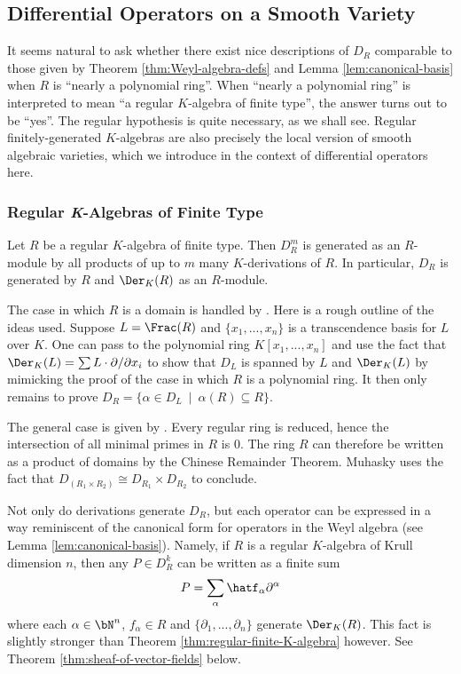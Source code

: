\subsection{Differential Operators on a Smooth Variety}\label{sec:diff-op-examples}
It seems natural to ask whether there exist nice descriptions of $D_{R}$ comparable to those given by Theorem \ref{thm:Weyl-algebra-defs} and Lemma \ref{lem:canonical-basis} when $R$ is ``nearly a polynomial ring''. When ``nearly a polynomial ring'' is interpreted to mean ``a regular $K$-algebra of finite type'', the answer turns out to be ``yes''. The regular hypothesis is quite necessary, as we shall see. Regular finitely-generated $K$-algebras are also precisely the local version of smooth algebraic varieties, which we introduce in the context of differential operators here.
\subsubsection{Regular \textit{K}-Algebras of Finite Type}

\begin{thm}\label{thm:regular-finite-K-algebra}
	Let $R$ be a regular $K$-algebra of finite type. Then $D^m_{R}$ is generated as an $R$-module by all products of up to $m$ many $K$-derivations of $R$. In particular, $D_{R}$ is generated by $R$ and $\Der_K(R)$ as an $R$-module.
\end{thm}
\begin{prf}
	The case in which $R$ is a domain is handled by \cite[Theorem 15.5.5]{mcconnell-robson}. Here is a rough outline of the ideas used. Suppose $L = \Frac(R)$ and $\{x_1,...,x_n\}$ is a transcendence basis for $L$ over $K$. One can pass to the polynomial ring $K[x_1,...,x_n]$ and use the fact that $\Der_K(L) = \sum L\cdot \partial/\partial x_i$ to show that $D_{L}$ is spanned by $L$ and $\Der_K(L)$ by mimicking the proof of the case in which $R$ is a polynomial ring. It then only remains to prove $D_{R} = \{\alpha \in D_{L} ~\mid~ \alpha(R) \subseteq R\}$.

	The general case is given by \cite[Theorem 1.15]{muhasky}. Every regular ring is reduced, hence the intersection of all minimal primes in $R$ is $0$. The ring $R$ can therefore be written as a product of domains by the Chinese Remainder Theorem. Muhasky uses the fact that $D_{(R_1\times R_2)} \cong D_{R_1} \times D_{R_2}$ to conclude.
\end{prf}
Not only do derivations generate $D_{R}$, but each operator can be expressed in a way reminiscent of the canonical form for operators in the Weyl algebra (see Lemma \ref{lem:canonical-basis}). Namely, if $R$ is a regular $K$-algebra of Krull dimension $n$, then any $P \in D^k_{R}$ can be written as a finite sum
\begin{align*}
	P = \sum_{\alpha} \hatf_\alpha \partial^\alpha
\end{align*}
where each $\alpha \in \bN^n$, $f_\alpha \in R$ and $\{\partial_1,...,\partial_n\}$ generate $\Der_{K}(R)$. This fact is slightly stronger than Theorem \ref{thm:regular-finite-K-algebra} however. See Theorem \ref{thm:sheaf-of-vector-fields} below.

